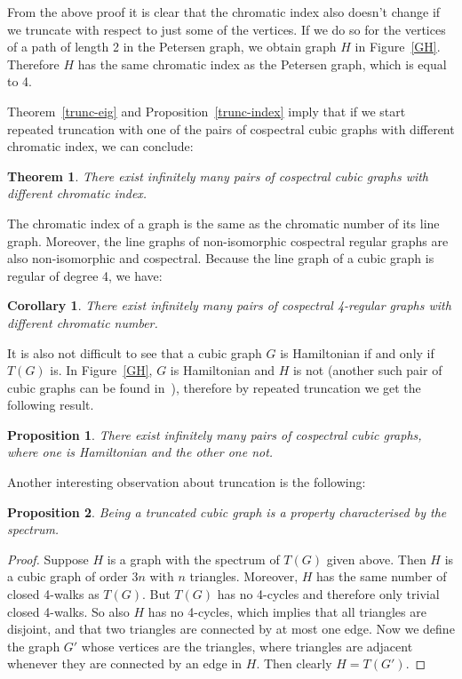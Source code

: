 \documentclass{article}
\newtheorem{proposition}{Proposition}
\newtheorem{corollary}{Corollary}
\newtheorem{theorem}{Theorem}
\begin{document}
From the above proof it is clear that the chromatic index also doesn't change if we truncate with respect to just some of the vertices. 
If we do so for the vertices of a path of length 2 in the Petersen graph,
we obtain graph $H$ in Figure~\ref{GH}.
Therefore $H$ has the same chromatic index as the Petersen graph, which is equal to 4.
  
Theorem~\ref{trunc-eig} and Proposition~\ref{trunc-index} imply that if we start repeated truncation with one of the pairs of cospectral cubic graphs 
with different chromatic index, we can conclude: 

\begin{theorem}\label{cospcub}
There exist infinitely many pairs of cospectral cubic graphs with different chromatic index.
\end{theorem}

The chromatic index of a graph is the same as the chromatic number of its line graph.
Moreover, the line graphs of non-isomorphic cospectral regular graphs are also non-isomorphic and cospectral. 
Because the line graph of a cubic graph is regular of degree 4, we have:

\begin{corollary}\label{cosp4reg}
There exist infinitely many pairs of cospectral 4-regular graphs with different chromatic number.
\end{corollary}

It is also not difficult to see that a cubic graph $G$ is Hamiltonian if and only if $T(G)$ is.
In Figure~\ref{GH}, $G$ is Hamiltonian and $H$ is not (another such pair of cubic graphs can be found in~\cite{LWYL}), therefore by repeated truncation we get the following result.

\begin{proposition}
There exist infinitely many pairs of cospectral cubic graphs, where one is Hamiltonian and the other one not.
\end{proposition}

Another interesting observation about truncation is the following:

\begin{proposition}
Being a truncated cubic graph is a property characterised by the spectrum.
\end{proposition}

\begin{proof}
Suppose $H$ is a graph with the spectrum of $T(G)$ given above.
Then $H$ is a cubic graph of order $3n$ with $n$ triangles.
Moreover, $H$ has the same number of closed 4-walks as $T(G)$.
But $T(G)$ has no 4-cycles and therefore only trivial closed 4-walks.
So also $H$ has no 4-cycles, which implies that all triangles are 
disjoint, and that two triangles are connected by at most one edge.
Now we define the graph $G'$ whose vertices are the triangles, 
where triangles are adjacent whenever they are connected by an edge in 
$H$. 
Then clearly $H=T(G')$.
\end{proof}
\end{document}
